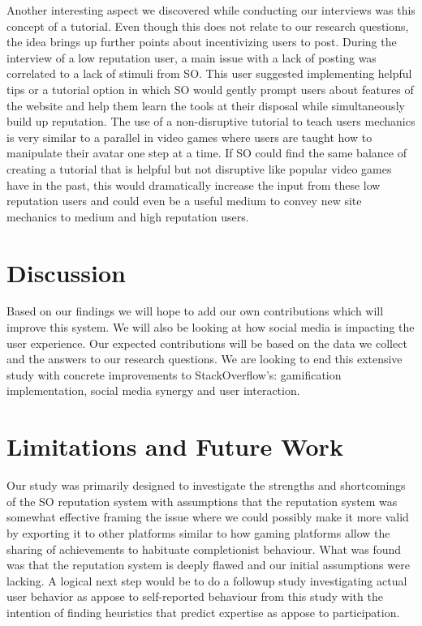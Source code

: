 \documentclass{sigchi}
\begin{document}
Another interesting aspect we discovered while conducting our interviews was this concept of a tutorial. Even though this does not relate to our research questions, the idea brings up further points about incentivizing users to post. During the interview of a low reputation user, a main issue with a lack of posting was correlated to a lack of stimuli from SO. This user suggested implementing helpful tips or a tutorial option in which SO would gently prompt users about features of the website and help them learn the tools at their disposal while simultaneously build up reputation. The use of a non-disruptive tutorial to teach users mechanics is very similar to a parallel in video games where users are taught how to manipulate their avatar one step at a time. If SO could find the same balance of creating a tutorial that is helpful but not disruptive like popular video games have in the past, this would dramatically increase the input from these low reputation users and could even be a useful medium to convey new site mechanics to medium and high reputation users.

\section{Discussion}

 Based on our findings we will hope to add our own contributions which will improve this system. We will also be looking at how social media is impacting the user experience. Our expected contributions will be based on the data we collect and the answers to our research questions. We are looking to end this extensive study with concrete improvements to StackOverflow’s: gamification implementation, social media synergy and user interaction.

\section{Limitations and Future Work}

Our study was primarily designed to investigate the strengths and shortcomings of the SO reputation system with assumptions that the reputation system was somewhat effective framing the issue where we could possibly make it more valid by exporting it to other platforms similar to how gaming platforms allow the sharing of achievements to habituate completionist behaviour. What was found was that the reputation system is deeply flawed and our initial assumptions were lacking. A logical next step would be to do a followup study investigating actual user behavior as appose to self-reported behaviour from this study with the intention of finding heuristics that predict expertise as appose to participation. 
\end{document}
